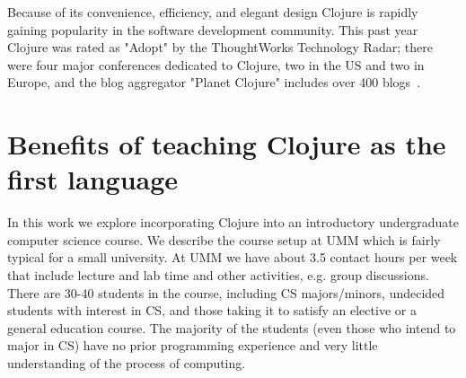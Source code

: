 \documentclass[submission,copyright,creativecommons]{eptcs}
\newcommand{\allcomments}[1]{{#1}}
\newcommand{\elenacomment}[1]{{\bf \textcolor{ForestGreen}{\allcomments{{#1}}}}}
\newcommand{\stephencomment}[1]{{\bf \color{StephensBlue}{\allcomments{{#1}}}}} %
\newcommand{\joecomment}[1]{{\bf \color{JoesGold}{\allcomments{{#1}}}}}
\begin{document}
Because of its convenience, efficiency, and elegant design 
Clojure is rapidly gaining popularity in the software development community. This past year Clojure was rated as "Adopt" by the ThoughtWorks Technology Radar; there were four major conferences dedicated to Clojure, two in the US and two in Europe, and the blog aggregator "Planet Clojure" includes over 400 blogs~\cite{clojure:review}. 

\section{Benefits of teaching Clojure as the first language}\label{sec:benefits}
In this work we explore incorporating Clojure into an introductory undergraduate computer science course. We describe the course setup at UMM which is fairly typical for a small university. At UMM we have about 3.5 contact hours per week that include lecture and lab time and other activities, e.g. group discussions. There are 30-40 students in the course, including CS majors/minors, undecided students with  interest in CS, and those taking it to satisfy an elective or a general education course. The majority of the students (even those who intend to major in CS)  have no prior programming experience and very little understanding of the process of computing. 
\end{document}
